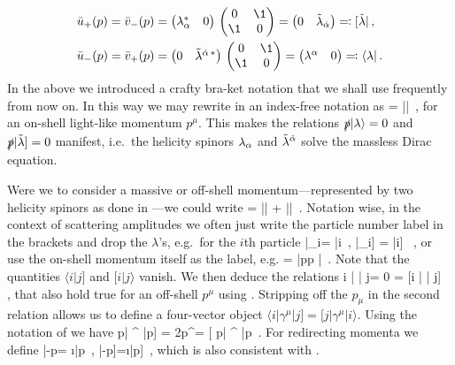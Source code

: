 %
\begin{align}
\label{uvpmdef2}
\begin{aligned}
\bar u_{+}(p)= \bar v_{-}(p)&=\begin{pmatrix} \la_{\a}^{\ast} & 0 \end{pmatrix} \,
\begin{pmatrix} 0 & \1 \\ \1 & 0 \end{pmatrix} =
\begin{pmatrix} 0& \tla_{\da} \end{pmatrix}
\eqqcolon [\tla| \,, \\
\bar u_{-}(p)= \bar v_{+}(p) &=
\begin{pmatrix} 0 & \tla^{\da\,\ast} \end{pmatrix} \,
\begin{pmatrix} 0 &\1 \\ \1 & 0 \end{pmatrix} =
\begin{pmatrix} \la^{\a} & 0 \end{pmatrix}
 \eqqcolon \langle \la |\, .
\end{aligned}
\end{align}
%
In the above we introduced a crafty bra-ket notation that we shall use frequently from now on. 
In this way we may rewrite  in an index-free notation as
%
\be
{} = |\la\rangle [\tla| + |\tla]\langle \la |\, ,
\ee
%
for an on-shell light-like momentum $p^{\mu}$. 
This makes the relations $\slashed{p}|\lambda\rangle =0 $ and  $\slashed{p}|\tilde\lambda] =0 $ 
manifest, i.e.~the
helicity spinors $\lambda_{\alpha}$ and $\tilde\lambda^{{\dot{\alpha}}}$ solve the massless Dirac equation.

Were we to consider a massive or off-shell momentum---represented by two helicity spinors as done in ---we could write
\be
\label{offshellpsslash}
 = |\la\rangle [\tla| + |\tla]\langle \la | + 
 |\mu\rangle [\tilde\mu| + |\tilde\mu]\langle \mu |\, .
 \ee
%
Notation wise, in the context of scattering amplitudes we often just write the particle number label in the brackets and drop the $\lambda$'s, e.g.~for the $i$th particle
%
\be
|\la_{i}\rangle = |i\rangle\, , \qquad |\la_{i}] = |i] \, , 
\ee
%
or use the on-shell momentum itself as the label, e.g.
%
\be
\label{pspinorde}
 = |p\rangle [p| + |p]\langle p |\, .
\ee
%
Note that the quantities $\langle i|j]$ and $[i|j\rangle$ vanish. We
then deduce the relations
%
\be
\langle i |  | j\rangle = 0 = [i |  | j]\, \quad {} \quad
[i|\slashed{p} |j\rangle = \langle j|\slashed{p} |i] \, ,
\ee
%
that also hold true for an off-shell $p^{\mu}$ using .
Stripping off the $p_{\mu}$ in the second relation allows us to define a four-vector object
$\langle i| \gamma^{\mu} |j] = [ j| \gamma^{\mu} |i\rangle $. Using the notation of
 we have
%
\be \label{eq:pmufromspinors}
\langle p| \gamma^{\mu} |p] = 2p^{\mu}= [ p| \gamma^{\mu} |p\rangle \, .
\ee
For redirecting momenta we define
%
\be
\label{negpspin}
|-p\rangle = \i |p\rangle\, , \qquad |-p]=\i |p]\, ,
\ee
%
which is also consistent with .

